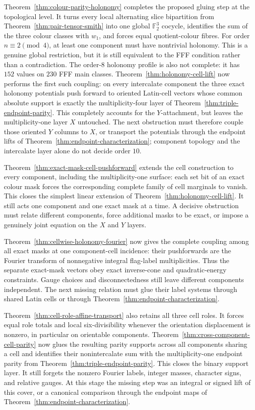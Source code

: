 Theorem~\ref{thm:colour-parity-holonomy} completes the proposed gluing step
at the topological level.  It turns every local alternating slice
bipartition from Theorem~\ref{thm:pair-tensor-smith} into one global
$\mathbb F_2^3$ cocycle, identifies the sum of the
three colour classes with $w_1$, and forces equal quotient-colour fibres.
For order $n\equiv2\pmod4$, at least one component must have nontrivial
holonomy.  This is a genuine global restriction, but it is still equivalent
to the FFF condition rather than a contradiction.  The order-$8$ holonomy
profile is also not complete: it has $152$ values on $230$ FFF main classes.
Theorem~\ref{thm:holonomy-cell-lift} now performs the first such coupling:
on every intercalate component the three exact holonomy potentials push
forward to oriented Latin-cell vectors whose common absolute support is
exactly the multiplicity-four layer of
Theorem~\ref{thm:triple-endpoint-parity}.  This completely accounts for the
$Y$-attachment, but leaves the multiplicity-one layer $X$ untouched.  The
next obstruction must therefore couple those oriented $Y$ columns to $X$, or
transport the potentials through the endpoint lifts of
Theorem~\ref{thm:endpoint-characterization}; component topology
and the intercalate layer alone do not decide order $10$.

Theorem~\ref{thm:exact-mask-cell-pushforward} extends the cell construction
to every component, including the multiplicity-one surface: each set bit of
an exact colour mask forces the corresponding complete family of cell
marginals to vanish.  This closes the simplest linear extension of
Theorem~\ref{thm:holonomy-cell-lift}.
It still acts one component and one exact mask at a time.  A decisive
obstruction must relate different components, force additional masks to be
exact, or impose a genuinely joint equation on the $X$ and $Y$ layers.

Theorem~\ref{thm:cellwise-holonomy-fourier} now gives the complete coupling
among all exact masks at one component-cell incidence: their pushforwards are
the Fourier transform of nonnegative integral flag-label multiplicities.
Thus the separate exact-mask vectors obey exact inverse-cone and
quadratic-energy
constraints.  Gauge choices and disconnectedness still leave different
components independent.  The next missing relation must glue their label
systems through shared Latin cells or through
Theorem~\ref{thm:endpoint-characterization}.

Theorem~\ref{thm:cell-role-affine-transport} also retains all three cell
roles.  It forces equal role totals and local six-divisibility whenever the
orientation displacement is nonzero, in particular on orientable components.
Theorem~\ref{thm:cross-component-cell-parity} now glues the resulting parity
supports across all components sharing a cell and identifies their
nonintercalate sum with the multiplicity-one endpoint parity from
Theorem~\ref{thm:triple-endpoint-parity}.  This closes
the binary support layer.  It still forgets the nonzero Fourier labels,
integer masses, character signs, and relative gauges.  At this stage the
missing step was an integral or signed lift of this cover, or a canonical
comparison through the endpoint maps of
Theorem~\ref{thm:endpoint-characterization}.

